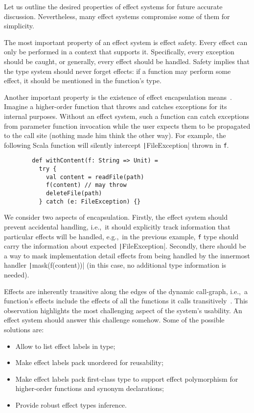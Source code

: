 \documentclass[conference]{IEEEtran}
\begin{document}
    Let us outline the desired properties of effect systems for future accurate discussion.
    Nevertheless, many effect systems compromise some of them for simplicity.

    The most important property of an effect system is effect safety.
    Every effect can only be performed in a context that supports it.
    Specifically, every exception should be caught, or generally, every effect should be handled.
    Safety implies that the type system should never forget effects: if a function may perform some effect, it should be mentioned in the function's type.

    Another important property is the existence of effect encapsulation means~\cite{lindley2018encapsulating}.
    Imagine a higher-order function that throws and catches exceptions for its internal purposes.
    Without an effect system, such a function can catch exceptions from parameter function invocation while the user expects them to be propagated to the call site (nothing made him think the other way).
    For example, the following Scala function will silently intercept \texttt|FileException| thrown in \texttt{f}.
    \begin{verbatim}
        def withContent(f: String => Unit) =
          try {
            val content = readFile(path)
            f(content) // may throw
            deleteFile(path)
          } catch (e: FileException) {}
    \end{verbatim}

    We consider two aspects of encapsulation.
    Firstly, the effect system should prevent accidental handling, i.e.,\ it should explicitly track information that particular effects will be handled, e.g.,\ in the previous example, \texttt{f} type should carry the information about expected \texttt|FileException|.
    Secondly, there should be a way to mask implementation detail effects from being handled by the innermost handler \texttt|mask(f(content))| (in this case, no additional type information is needed).

    Effects are inherently transitive along the edges of the dynamic call-graph, i.e.,\ a function's effects include the effects of all the functions it calls transitively~\cite{odersky2022scoped}.
    This observation highlights the most challenging aspect of the system's usability.
    An effect system should answer this challenge somehow.
    Some of the possible solutions are:
    \begin{itemize}
        \item Allow to list effect labels in type;
        \item Make effect labels pack unordered for reusability;
        \item Make effect labels pack first-class type to support effect polymorphism for higher-order functions and synonym declarations;
        \item Provide robust effect types inference.
    \end{itemize}
\end{document}
